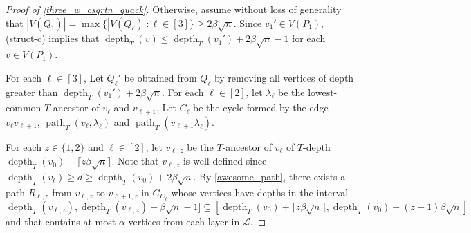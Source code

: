 \documentclass{patmorin}
\DeclareMathOperator{\depth}{depth}
\DeclareMathOperator{\pth}{path}
\begin{document}
\begin{proof}[Proof of \cref{three_w_csqrtn_quack}]
  Otherwise, assume without loss of generality that $|V(Q_1)|=\max\{|V(Q_\ell)|:\ell\in[3]\}\ge 2\beta\sqrt{n}$.  Since $v_1'\in V(P_1)$, (struct-c) implies that $\depth_T(v)\le \depth_T(v_1')+2\beta\sqrt{n}-1$ for each $v\in V(P_1)$.



  For each $\ell\in[3]$, Let $Q_\ell'$ be obtained from $Q_\ell$ by removing all vertices of depth greater than $\depth_T(v_1')+2\beta\sqrt{n}$.
  For each $\ell\in[2]$, let $\lambda_\ell$ be the lowest-common $T$-ancestor of $v_\ell$ and $v_{\ell+1}$.
  Let $C_\ell$ be the cycle formed by the edge $v_\ell v_{\ell+1}$,  $\pth_T(v_\ell,\lambda_\ell)$ and $\pth_T(v_{\ell+1}\lambda_\ell)$.

  For each $z\in\{1,2\}$ and $\ell\in[2]$, let $v_{\ell,z}$ be the $T$-ancestor of $v_\ell$ of $T$-depth $\depth_T(v_0)+\lceil z\beta\sqrt{n}\rceil$.  Note that $v_{\ell,z}$ is well-defined since $\depth_T(v_\ell)\ge d \ge \depth_T(v_0)+2\beta\sqrt{n}$.
  By \cref{awesome_path}, there exists a path $R_{\ell,z}$ from $v_{\ell,z}$ to $v_{\ell+1,z}$ in  $G_{C_\ell}$ whose vertices have depths in the interval
  \begin{equation}
    \depth_T(v_{\ell,z}),\depth_T(v_{\ell,z})+\beta\sqrt{n}-1]
    \subseteq[\depth_T(v_0)+\lceil z\beta\sqrt{n}\rceil,\depth_T(v_0)+ (z+1)\beta\sqrt{n}] \label{face_span}
  \end{equation}
  and that contains at most $\alpha$ vertices from each layer in $\mathcal{L}$.


\end{proof}
\end{document}
